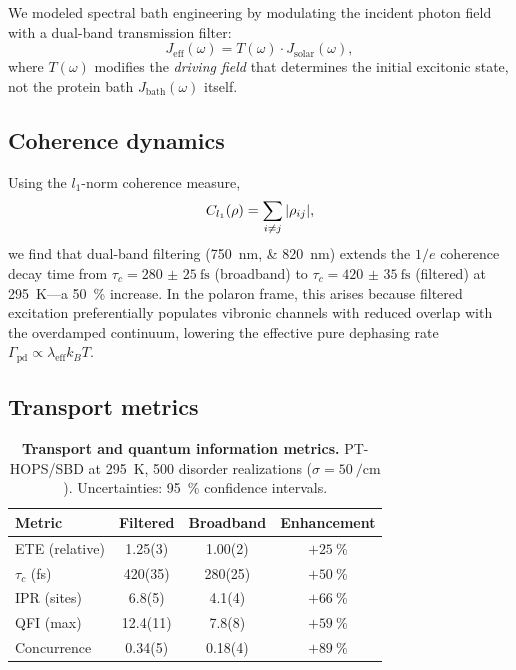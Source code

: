 \documentclass[journal=jctc,manuscript=article]{achemso}
\begin{document}
We modeled spectral bath engineering by modulating the incident photon field with a dual-band transmission filter:
\begin{equation}
J_{\mathrm{eff}}(\omega) = T(\omega) \cdot J_{\mathrm{solar}}(\omega),
\label{eq:filtered_spectral_density}
\end{equation}
where $T(\omega)$ modifies the \textit{driving field} that determines the initial excitonic state, not the protein bath $J_{\mathrm{bath}}(\omega)$ itself.

\subsection{Coherence dynamics}
Using the $l_1$-norm coherence measure,\cite{Baumgratz2014}
\begin{equation}
C_{l_1}(\rho) = \sum_{i \neq j} \abs{\rho_{ij}},
\end{equation}
we find that dual-band filtering (\SIlist{750;820}{\nano\meter}) extends the $1/e$ coherence decay time from $\tau_c = \SI{280(25)}{\femto\second}$ (broadband) to $\tau_c = \SI{420(35)}{\femto\second}$ (filtered) at \SI{295}{\kelvin}---a \SI{50}{\percent} increase. In the polaron frame,\cite{Jang2008} this arises because filtered excitation preferentially populates vibronic channels with reduced overlap with the overdamped continuum, lowering the effective pure dephasing rate $\Gamma_{\mathrm{pd}} \propto \lambda_{\mathrm{eff}} k_B T$.

\subsection{Transport metrics}

\begin{table}[h]
\centering
\caption{\textbf{Transport and quantum information metrics.} PT-HOPS/SBD at \SI{295}{\kelvin}, \num{500} disorder realizations ($\sigma = \SI{50}{\per\centi\meter}$). Uncertainties: \SI{95}{\percent} confidence intervals.}
\label{tab:metrics}
\begin{tabular}{lccc}
\toprule
\textbf{Metric} & \textbf{Filtered} & \textbf{Broadband} & \textbf{Enhancement} \\
\midrule
ETE (relative) & 1.25(3) & 1.00(2) & $+\SI{25}{\percent}$ \\
$\tau_c$ (\si{\femto\second}) & 420(35) & 280(25) & $+\SI{50}{\percent}$ \\
IPR (sites) & 6.8(5) & 4.1(4) & $+\SI{66}{\percent}$ \\
QFI (max) & 12.4(11) & 7.8(8) & $+\SI{59}{\percent}$ \\
Concurrence & 0.34(5) & 0.18(4) & $+\SI{89}{\percent}$ \\
\bottomrule
\end{tabular}
\end{table}
\end{document}
